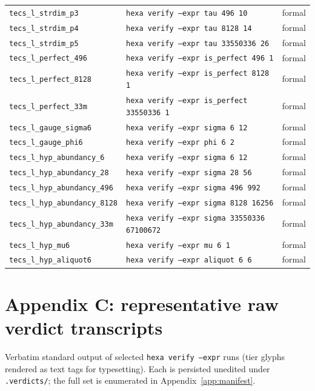 \documentclass[11pt,a4paper]{article}
\theoremstyle{definition}
\begin{document}
\begin{longtable}{lll}
\texttt{tecs\_l\_strdim\_p3} & \texttt{hexa verify --expr tau 496 10} & formal \\
\texttt{tecs\_l\_strdim\_p4} & \texttt{hexa verify --expr tau 8128 14} & formal \\
\texttt{tecs\_l\_strdim\_p5} & \texttt{hexa verify --expr tau 33550336 26} & formal \\
\texttt{tecs\_l\_perfect\_496} & \texttt{hexa verify --expr is\_perfect 496 1} & formal \\
\texttt{tecs\_l\_perfect\_8128} & \texttt{hexa verify --expr is\_perfect 8128 1} & formal \\
\texttt{tecs\_l\_perfect\_33m} & \texttt{hexa verify --expr is\_perfect 33550336 1} & formal \\
\texttt{tecs\_l\_gauge\_sigma6} & \texttt{hexa verify --expr sigma 6 12} & formal \\
\texttt{tecs\_l\_gauge\_phi6} & \texttt{hexa verify --expr phi 6 2} & formal \\
\texttt{tecs\_l\_hyp\_abundancy\_6} & \texttt{hexa verify --expr sigma 6 12} & formal \\
\texttt{tecs\_l\_hyp\_abundancy\_28} & \texttt{hexa verify --expr sigma 28 56} & formal \\
\texttt{tecs\_l\_hyp\_abundancy\_496} & \texttt{hexa verify --expr sigma 496 992} & formal \\
\texttt{tecs\_l\_hyp\_abundancy\_8128} & \texttt{hexa verify --expr sigma 8128 16256} & formal \\
\texttt{tecs\_l\_hyp\_abundancy\_33m} & \texttt{hexa verify --expr sigma 33550336 67100672} & formal \\
\texttt{tecs\_l\_hyp\_mu6} & \texttt{hexa verify --expr mu 6 1} & formal \\
\texttt{tecs\_l\_hyp\_aliquot6} & \texttt{hexa verify --expr aliquot 6 6} & formal \\
\bottomrule
\end{longtable}\endgroup

\section{Appendix C: representative raw verdict transcripts}
\label{app:transcripts}
Verbatim standard output of selected \texttt{hexa verify --expr} runs (tier glyphs rendered as text tags for typesetting). Each is persisted unedited under \texttt{.verdicts/}; the full set is enumerated in Appendix~\ref{app:manifest}.
\end{document}
